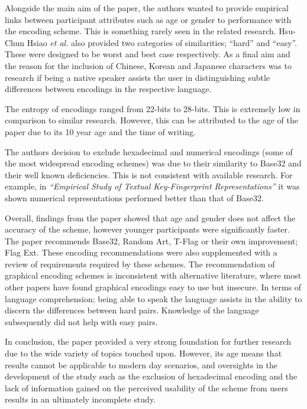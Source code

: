 Alongside the main aim of the paper, the authors wanted to provide empirical links between participant attributes such as age or gender to performance with the encoding scheme. This is something rarely seen in the related research. Hsu-Chun Hsiao \textit{et al.} also provided two categories of similarities; ``hard'' and ``easy''. These were designed to be worst and best case respectively. As a final aim and the reason for the inclusion of Chinese, Korean and Japanese characters was to research if being a native speaker assists the user in distinguishing subtle differences between encodings in the respective language.

The entropy of encodings ranged from 22-bits to 28-bits. This is extremely low in comparison to similar research. However, this can be attributed to the age of the paper due to its 10 year age and the time of writing. 

The authors decision to exclude hexadecimal and numerical encodings (some of the most widespread encoding schemes) was due to their similarity to Base32 and their well known deficiencies. This is not consistent with available research. For example, in \textit{``Empirical Study of Textual Key-Fingerprint Representations''} it was shown numerical representations performed better than that of Base32.

Overall, findings from the paper showed that age and gender does not affect the accuracy of the scheme, however younger participants were significantly faster. \\
The paper recommends Base32, Random Art, T-Flag or their own improvement; Flag Ext. These encoding recommendations were also supplemented with a review of requirements required by these schemes. The recommendation of graphical encoding schemes is inconsistent with alternative literature, where most other papers have found graphical encodings easy to use but insecure.
In terms of language comprehension; being able to speak the language assists in the ability to discern the differences between hard pairs. Knowledge of the language subsequently did not help with easy pairs.

In conclusion, the paper provided a very strong foundation for further research due to the wide variety of topics touched upon. However, its age means that results cannot be applicable to modern day scenarios, and oversights in the development of the study such as the exclusion of hexadecimal encoding and the lack of information gained on the perceived usability of the scheme from users results in an ultimately incomplete study.

